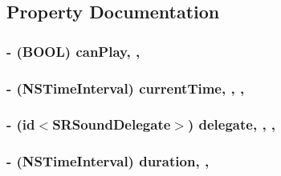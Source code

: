 \subsection{Property Documentation}
\hypertarget{interface_s_e_sound_a987f2a9cce1f3a3a9c888358acf80649}{
\subsubsection[{can\-Play}]{\setlength{\rightskip}{0pt plus 5cm}-\/ (B\-O\-O\-L) can\-Play\hspace{0.3cm}{\ttfamily [read]}, {\ttfamily [nonatomic]}, {\ttfamily [assign]}}}\label{interface_s_e_sound_a987f2a9cce1f3a3a9c888358acf80649}
\hypertarget{interface_s_e_sound_ad05f292aa572613e1012562a4c713e04}{
\subsubsection[{current\-Time}]{\setlength{\rightskip}{0pt plus 5cm}-\/ (N\-S\-Time\-Interval) current\-Time\hspace{0.3cm}{\ttfamily [read]}, {\ttfamily [write]}, {\ttfamily [nonatomic]}, {\ttfamily [assign]}}}\label{interface_s_e_sound_ad05f292aa572613e1012562a4c713e04}
\hypertarget{interface_s_e_sound_a5e5c016dc31e60d35799f5535f6afa7b}{
\subsubsection[{delegate}]{\setlength{\rightskip}{0pt plus 5cm}-\/ (id$<${\bf S\-R\-Sound\-Delegate}$>$) delegate\hspace{0.3cm}{\ttfamily [read]}, {\ttfamily [write]}, {\ttfamily [nonatomic]}, {\ttfamily [weak]}}}\label{interface_s_e_sound_a5e5c016dc31e60d35799f5535f6afa7b}
\hypertarget{interface_s_e_sound_a0641c721c6b3c998eb56ed060b421bad}{
\subsubsection[{duration}]{\setlength{\rightskip}{0pt plus 5cm}-\/ (N\-S\-Time\-Interval) duration\hspace{0.3cm}{\ttfamily [read]}, {\ttfamily [nonatomic]}, {\ttfamily [assign]}}}\label{interface_s_e_sound_a0641c721c6b3c998eb56ed060b421bad}
